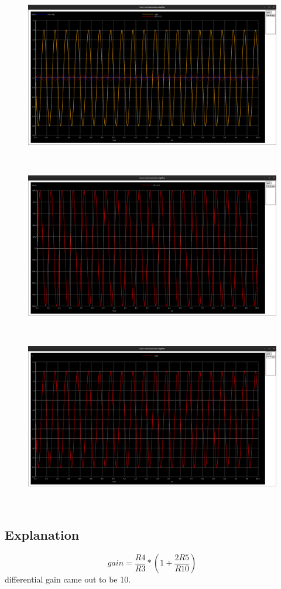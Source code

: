 \documentclass[12pt]{article}
\begin{document}
\newpage
\begin{figure}[h!]
\centering
\includegraphics[scale = 0.2]{q2_c.png}
\end{figure}\\
\newpage

\begin{figure}[h!]
\centering
\includegraphics[scale = 0.2]{q2_c_vi1-vi2.png}
\end{figure}\\
\newpage
\begin{figure}[h!]
\centering
\includegraphics[scale = 0.2]{q2_c_vout.png}
\end{figure}\\
\newpage
\subsection{Explanation}
\begin{equation}
    gain=\frac{R4}{R3}*(1+\frac{2R5}{R10})
\end{equation}
differential gain came out to be 10.
\end{document}
